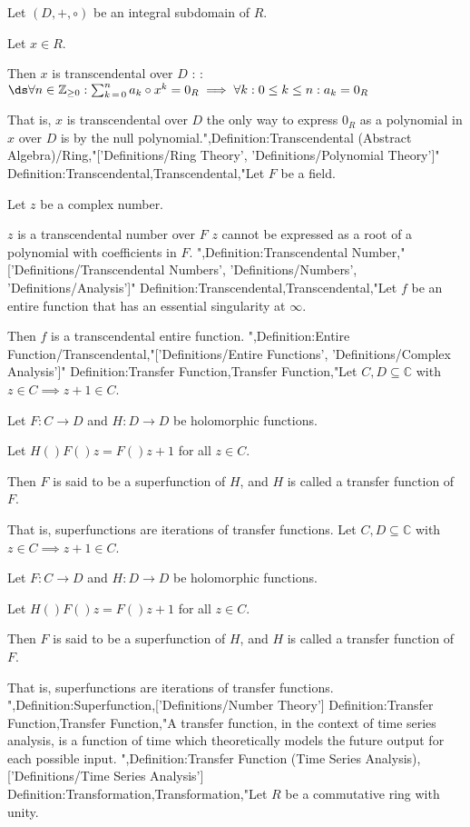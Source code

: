Let $\left( D, +, \circ \right)$ be an integral subdomain of $R$.

Let $x \in R$.


Then $x$ is transcendental over $D$ :
:$\ds \forall n \in \mathbb Z_{\ge 0}: \sum_{k \mathop = 0}^n a_k \circ x^k = 0_R \implies \forall k: 0 \le k \le n: a_k = 0_R$


That is, $x$ is transcendental over $D$  the only way to express $0_R$ as a polynomial in $x$ over $D$ is by the null polynomial.",Definition:Transcendental (Abstract Algebra)/Ring,"['Definitions/Ring Theory', 'Definitions/Polynomial Theory']"
Definition:Transcendental,Transcendental,"Let $F$ be a field.

Let $z$ be a complex number.

$z$ is a transcendental number over $F$  $z$ cannot be expressed as a root of a polynomial with coefficients in $F$.
",Definition:Transcendental Number,"['Definitions/Transcendental Numbers', 'Definitions/Numbers', 'Definitions/Analysis']"
Definition:Transcendental,Transcendental,"Let $f$ be an entire function that has an essential singularity at $\infty$.

Then $f$ is a transcendental entire function.
",Definition:Entire Function/Transcendental,"['Definitions/Entire Functions', 'Definitions/Complex Analysis']"
Definition:Transfer Function,Transfer Function,"Let $C, D \subseteq \mathbb C$ with $z \in C \implies z + 1 \in C$.

Let $F: C \to D$ and $H: D \to D$ be holomorphic functions.

Let $H \left(   \right){F \left(   \right)z} = F \left(   \right){z + 1}$ for all $z \in C$.

Then $F$ is said to be a superfunction of $H$, and $H$ is called a transfer function of $F$.

That is, superfunctions are iterations of transfer functions.
Let $C, D \subseteq \mathbb C$ with $z \in C \implies z + 1 \in C$.

Let $F: C \to D$ and $H: D \to D$ be holomorphic functions.

Let $H \left(   \right){F \left(   \right)z} = F \left(   \right){z + 1}$ for all $z \in C$.

Then $F$ is said to be a superfunction of $H$, and $H$ is called a transfer function of $F$.

That is, superfunctions are iterations of transfer functions.
",Definition:Superfunction,['Definitions/Number Theory']
Definition:Transfer Function,Transfer Function,"A transfer function, in the context of time series analysis, is a function of time which theoretically models the future output for each possible input.
",Definition:Transfer Function (Time Series Analysis),['Definitions/Time Series Analysis']
Definition:Transformation,Transformation,"Let $R$ be a commutative ring with unity.

